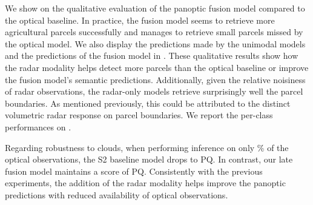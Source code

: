 We show on  the qualitative evaluation of the panoptic fusion model compared to the optical baseline. In practice, the fusion model seems to retrieve more agricultural parcels successfully and manages to retrieve small parcels missed by the optical model. We also display the predictions made by the unimodal models and the predictions of the fusion model in . These qualitative results show how the radar modality helps detect more parcels than the optical baseline or improve the fusion model's semantic predictions. Additionally, given the relative noisiness of radar observations, the radar-only models retrieve surprisingly well the parcel boundaries. {As mentioned previously, this could be attributed to the distinct volumetric radar response on parcel boundaries.}  We report the per-class performances on . 

Regarding robustness to clouds, when performing inference on only \% of the optical observations, the S2 baseline model drops to  PQ. In contrast, our late fusion model maintains a score of  PQ. Consistently with the previous experiments, the addition of the radar modality helps improve the panoptic predictions with reduced availability of optical observations.








